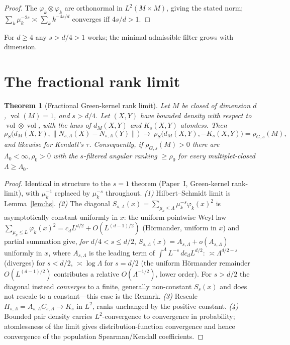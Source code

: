 \documentclass[11pt]{article}
\newtheorem{theorem}{Theorem}
\theoremstyle{remark}
\newcommand{\vol}{\operatorname{vol}}
\newcommand{\dM}{d_M}
\begin{document}
\begin{proof}
The $\varphi_k\otimes\varphi_k$ are orthonormal in $L^2(M\times M)$, giving the stated norm;
$\sum_k\mu_k^{-2s}\asymp\sum_k k^{-4s/d}$ converges iff $4s/d>1$.
\end{proof}

For $d\ge4$ any $s>d/4>1$ works; the minimal admissible filter grows with dimension.

\section{The fractional rank limit}

\begin{theorem}[Fractional Green-kernel rank limit]\label{thm:fraclimit}
Let $M$ be closed of dimension $d$, $\vol(M)=1$, and $s>d/4$. Let $(X,Y)$ have bounded
density with respect to $\vol\otimes\vol$, with the laws of $\dM(X,Y)$ and $K_s(X,Y)$
atomless. Then
\[
\rho_S\bigl(\dM(X,Y),\lVert N_{s,\Lambda}(X)-N_{s,\Lambda}(Y)\rVert\bigr)\ \longrightarrow\
\rho_S\bigl(\dM(X,Y),-K_s(X,Y)\bigr)=\rho_{G,s}(M),
\]
and likewise for Kendall's $\tau$. Consequently, if $\rho_{G,s}(M)>0$ there are
$\Lambda_0<\infty,\rho_0>0$ with the $s$-filtered angular ranking $\ge\rho_0$ for every
multiplet-closed $\Lambda\ge\Lambda_0$.
\end{theorem}

\begin{proof}
Identical in structure to the $s=1$ theorem (Paper~I, Green-kernel rank-limit), with
$\mu_k^{-1}$ replaced by $\mu_k^{-s}$ throughout. \emph{(1)} Hilbert--Schmidt limit is
Lemma~\ref{lem:hs}. \emph{(2)} The diagonal $S_{s,\Lambda}(x)=\sum_{\mu_k\le\Lambda}\mu_k^{-s}\varphi_k(x)^2$
is asymptotically constant uniformly in $x$: the uniform pointwise Weyl law
$\sum_{\mu_k\le L}\varphi_k(x)^2=c_dL^{d/2}+O(L^{(d-1)/2})$ (H\"ormander, uniform in $x$) and
partial summation give, \emph{for $d/4<s\le d/2$}, $S_{s,\Lambda}(x)=A_{s,\Lambda}+o(A_{s,\Lambda})$
uniformly in $x$, where $A_{s,\Lambda}$ is the leading term of $\int^\Lambda L^{-s}\,dc_dL^{d/2}$:
$\asymp\Lambda^{d/2-s}$ (diverges) for $s<d/2$, $\asymp\log\Lambda$ for $s=d/2$ (the uniform
Hörmander remainder $O(L^{(d-1)/2})$ contributes a relative $O(\Lambda^{-1/2})$, lower order).
For $s>d/2$ the diagonal instead \emph{converges} to a finite, generally non-constant $S_s(x)$
and does not rescale to a constant---this case is the Remark. \emph{(3)} Rescale $H_{s,\Lambda}=A_{s,\Lambda}C_{s,\Lambda}\to K_s$
in $L^2$, ranks unchanged by the positive constant. \emph{(4)} Bounded pair density carries
$L^2$-convergence to convergence in probability; atomlessness of the limit gives distribution-function
convergence and hence convergence of the population Spearman/Kendall coefficients.
\end{proof}
\end{document}
